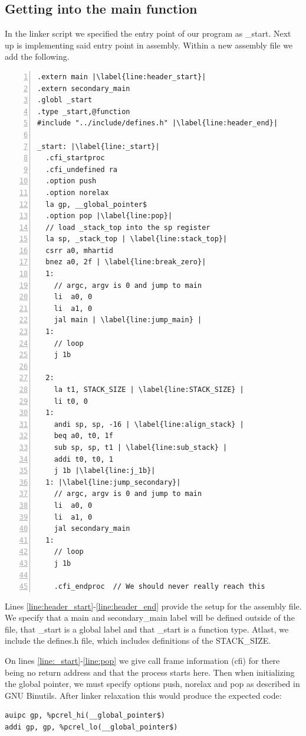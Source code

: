 \subsection{Getting into the main function}\label{sec:get_main}
In the linker script we specified the entry point of our program as \_start. Next up
is implementing said entry point in assembly. Within a new assembly file we add the following.
\begin{lstlisting}[numbers=left, escapechar=|]
.extern main |\label{line:header_start}|
.extern secondary_main
.globl _start
.type _start,@function
#include "../include/defines.h" |\label{line:header_end}|

_start: |\label{line:_start}|
  .cfi_startproc
  .cfi_undefined ra
  .option push
  .option norelax
  la gp, __global_pointer$
  .option pop |\label{line:pop}|
  // load _stack_top into the sp register
  la sp, _stack_top | \label{line:stack_top}|
  csrr a0, mhartid
  bnez a0, 2f | \label{line:break_zero}|
  1:
    // argc, argv is 0 and jump to main
    li  a0, 0
    li  a1, 0
    jal main | \label{line:jump_main} |
  1:
    // loop
    j 1b

  2:
    la t1, STACK_SIZE | \label{line:STACK_SIZE} |
    li t0, 0
  1:
    andi sp, sp, -16 | \label{line:align_stack} |
    beq a0, t0, 1f
    sub sp, sp, t1 | \label{line:sub_stack} |
    addi t0, t0, 1
    j 1b |\label{line:j_1b}|
  1: |\label{line:jump_secondary}|
    // argc, argv is 0 and jump to main
    li  a0, 0
    li  a1, 0
    jal secondary_main
  1:
    // loop
    j 1b

    .cfi_endproc  // We should never really reach this
\end{lstlisting}
Lines \ref{line:header_start}-\ref{line:header_end} provide the setup for the
assembly file. We specify that a main and secondary\_main label will be defined outside of the file,
that \_start is a global label and that \_start is a function type. Atlast, we
include the defines.h file, which includes definitions of the STACK\_SIZE.

On lines \ref{line:_start}-\ref{line:pop} we give call frame information (cfi)
for there being no return address and that the process starts here. Then when
initializing the global pointer, we must specify options push, norelax and pop
as described in GNU Binutils. \cite{GNU_bin} After linker relaxation this would
produce the expected code:
\begin{lstlisting}
auipc gp, %pcrel_hi(__global_pointer$)
addi gp, gp, %pcrel_lo(__global_pointer$)
\end{lstlisting}

